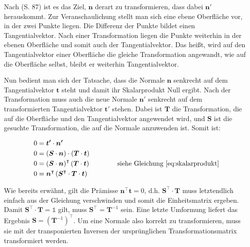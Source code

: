 Nach \cite{pharrhumphrey2010Physically} (S. 87) ist es das Ziel, \( \boldsymbol{n} \) derart zu transformieren, dass dabei \( \boldsymbol{n'} \) herauskommt. 
Zur Veranschaulichung stellt man sich eine ebene Oberfläche vor, in der zwei Punkte liegen. Die Differenz der Punkte bildet einen Tangentialvektor. Nach einer Transformation liegen die Punkte weiterhin in der ebenen Oberfläche und somit auch der Tangentialvektor.
Das heißt, wird auf den Tangentialvektor einer Oberfläche die gleiche Transformation angewandt, wie auf die Oberfläche selbst, bleibt er weiterhin Tangentialvektor.

Nun bedient man sich der Tatsache, dass die Normale \( \boldsymbol{n} \) senkrecht auf dem Tangentialvektor \( \boldsymbol{t} \) steht und damit ihr Skalarprodukt Null ergibt. Nach der Transformation muss auch die neue Normale \( \boldsymbol{n'} \) senkrecht auf dem transformierten Tangentialvektor \( \boldsymbol{t'} \) stehen. Dabei ist \( \boldsymbol{T} \) die Transformation, die auf die Oberfläche und den Tangentialvektor angewendet wird, und \( \boldsymbol{S} \) ist die gesuchte Transformation, die auf die Normale anzuwenden ist.
Somit ist:

\begin{align*}  
    0 &=  \boldsymbol{t'} \cdot \boldsymbol{n'} \\
    0 &=  \left( \boldsymbol{S} \cdot \boldsymbol{n} \right) \cdot \left( \boldsymbol{T} \cdot \boldsymbol{t} \right) \\
    0 &= \left( \boldsymbol{S} \cdot \boldsymbol{n} \right)^\intercal \left( \boldsymbol{T} \cdot \boldsymbol{t} \right)  \qquad \qquad \text{siehe Gleichung \ref{eq:skalarprodukt}} \\
    0 &= \boldsymbol{n}^\intercal \left( \boldsymbol{S}^\intercal \cdot \boldsymbol{T} \cdot \boldsymbol{t} \right)
\end{align*}

Wie bereits erwähnt, gilt die Prämisse  \( \boldsymbol{n}^\intercal \boldsymbol{t} = 0 \), d.h. \( \boldsymbol{S}^\intercal \cdot \boldsymbol{T} \) muss letztendlich einfach aus der Gleichung verschwinden und somit die Einheitsmatrix ergeben. Damit \( \boldsymbol{S}^\intercal \cdot \boldsymbol{T} = \mathds{1} \) gilt, muss \( \boldsymbol{S}^\intercal = \boldsymbol{T}^{-1} \) sein.
Eine letzte Umformung liefert das Ergebnis \( \boldsymbol{S} = (\boldsymbol{T}^{-1})^\intercal \). Um eine Normale also korrekt zu transformieren, muss sie mit der transponierten Inversen der ursprünglichen Transformationsmatrix transformiert werden.




